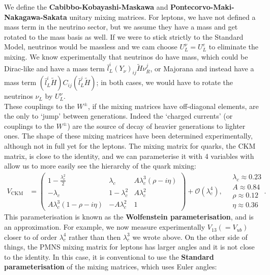\documentclass[a4paper, 11pt, normalem]{report}
\begin{document}
We define the \textbf{Cabibbo-Kobayashi-Maskawa} and \textbf{Pontecorvo-Maki-Nakagawa-Sakata} unitary mixing matrices.
For leptons, we have not defined a mass term in the neutrino sector, but we assume they have a mass and get rotated to the mass basis as well.
If we were to stick strictly to the Standard Model, neutrinos would be massless and we cam choose $U_L^\nu=U_L^e$ to eliminate the mixing.
We know experimentally that neutrinos do have mass, which could be Dirac-like and have a mass term $\bar{l}_L^i(Y_\nu)_{ij}\tilde{H}\nu_R^j$, or Majorana and instead have a mass term $(\bar{l}_L^i\tilde{H})C_{ij}(\bar{l}_L^j\tilde{H})$; in both cases, we would have to rotate the neutrinos $\nu_L$ by $U_L^\nu$.\\
These couplings to the $W^\pm$, if the mixing matrices have off-diagonal elements, are the only to `jump' between generations.
Indeed the `charged currents' (or couplings to the $W^\pm$) are the source of decay of heavier generations to lighter ones.
The shape of these mixing matrices have been determined experimentally, although not in full yet for the leptons.
The mixing matrix for quarks, the CKM matrix, is close to the identity, and we can parameterise it with 4 variables with allow us to more easily see the hierarchy of the quark mixing:
\begin{align}
    V_{\text{CKM}} &= \begin{pmatrix} 1 - \frac{\lambda_c^2}{2} & \lambda_c & A\lambda_c^3(\rho-i\eta) \\ -\lambda_c & 1-\lambda_c^2 & A\lambda_c^2 \\ A\lambda_c^3(1-\rho-i\eta) & -A\lambda_c^2 & 1 \end{pmatrix} + \mathcal{O}(\lambda_c^4),\quad \begin{matrix} \lambda_c \approx 0.23 \\ A \approx 0.84 \\ \rho\approx0.12 \\ \eta\approx0.36\end{matrix}.
\end{align}
This parameterisation is known as the \textbf{Wolfenstein parameterisation}, and is an approximation.
For example, we now measure experimentally $V_{13}(=V_{ub})$ closer to of order $\lambda_c^4$ rather than then $\lambda_c^3$ we wrote above.
On the other side of things, the PMNS mixing matrix for leptons has larger angles and it is not close to the identity.
In this case, it is conventional to use the \textbf{Standard parameterisation} of the mixing matrices, which uses Euler angles:
\end{document}
